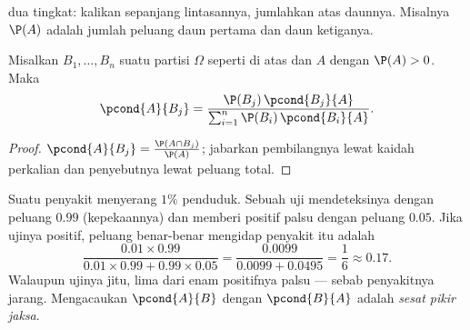 \begin{omfigure}

{\small {} dua tingkat: kalikan sepanjang lintasannya, jumlahkan atas daunnya.
Misalnya $\P(A)$ adalah jumlah peluang daun pertama dan daun
ketiganya.}
\end{omfigure}

\begin{theorem}\label{thm:g12:condprob:bayes}
Misalkan $B_1, \dots, B_n$ suatu partisi $\Omega$ seperti di atas dan $A$ 
dengan $\P(A) > 0$. Maka
\[
\pcond{A}{B_j} =
\frac{\P(B_j)\,\pcond{B_j}{A}}{\sum_{i=1}^{n} \P(B_i)\,\pcond{B_i}{A}} .
\]
\end{theorem}

\begin{proof}
$\pcond{A}{B_j} = \frac{\P(A \cap B_j)}{\P(A)}$; jabarkan pembilangnya lewat
kaidah perkalian dan penyebutnya lewat peluang total.
\end{proof}

\begin{example}\label{ex:g12:condprob:test}
Suatu penyakit menyerang $1\%$ penduduk. Sebuah uji mendeteksinya dengan peluang
$0.99$ (kepekaannya) dan memberi positif palsu dengan peluang $0.05$.
Jika ujinya positif, peluang benar-benar mengidap penyakit itu adalah
\[
\frac{0.01 \times 0.99}{0.01\times0.99 + 0.99\times0.05}
= \frac{0.0099}{0.0099 + 0.0495} = \frac{1}{6} \approx 0.17 .
\]
Walaupun ujinya jitu, lima dari enam positifnya palsu --- sebab
penyakitnya jarang. Mengacaukan $\pcond{A}{B}$ dengan $\pcond{B}{A}$ adalah
\emph{sesat pikir jaksa}.
\end{example}

